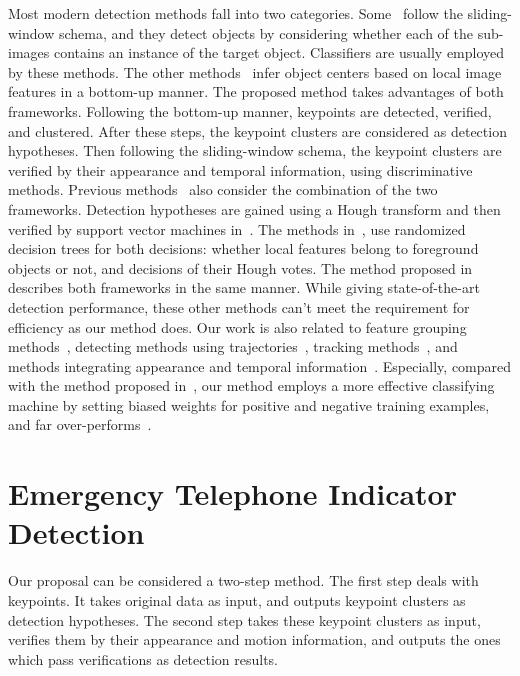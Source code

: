 \documentclass{JoITSRstyle}
\begin{document}
Most modern detection methods fall into two categories. Some~\cite{ij4,ac31,ac30,ac4,ac32,ac29,ac28,ac1} follow the sliding-window schema, and they detect objects by considering whether each of the sub-images contains an instance of the target object. Classifiers are usually employed by these methods. The other methods~\cite{ac9,ac2,ac3,ac5,ac10,ac21,ac18} infer object centers based on local image features in a bottom-up manner. The proposed method takes advantages of both frameworks. Following the bottom-up manner, keypoints are detected, verified, and clustered. After these steps, the keypoint clusters are considered as detection hypotheses. Then following the sliding-window schema, the keypoint clusters are verified by their appearance and temporal information, using discriminative methods.
Previous methods~\cite{ac34} also consider the combination of the two frameworks. Detection hypotheses are gained using a Hough transform and then verified by support vector machines in~\cite{ac10,ac25}. The methods in~\cite{ac6,ac7}, use randomized decision trees for both decisions: whether local features belong to foreground objects or not, and decisions of their Hough votes. The method proposed in~\cite{ac27} describes both frameworks in the same manner. While giving state-of-the-art detection performance, these other methods can't meet the requirement for efficiency as our method does.
Our work is also related to feature grouping methods~\cite{ac25}, detecting methods using trajectories~\cite{my9,ac24}, tracking methods~\cite{my7,my10}, and methods integrating appearance and temporal information~\cite{ac23}.
Especially, compared with the method proposed in~\cite{wang1}, our method employs a more effective classifying machine by setting biased weights for positive and negative training examples, and far over-performs~\cite{wang1}.

\section{Emergency Telephone Indicator Detection}
Our proposal can be considered a two-step method. The first step deals with keypoints. It
takes original data as input, and outputs keypoint clusters as detection hypotheses. The second
step takes these keypoint clusters as input, verifies them by their appearance and motion
information, and outputs the ones which pass verifications as detection results.
\end{document}
